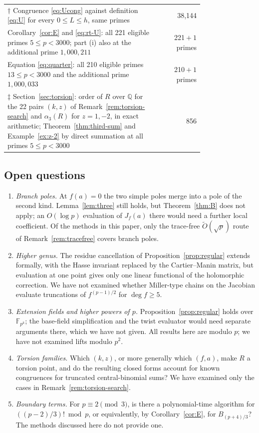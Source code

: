 \documentclass[11pt,a4paper]{article}
\numberwithin{equation}{section}
\theoremstyle{plain}
\theoremstyle{definition}
\newcommand{\F}{\mathbb{F}}
\begin{document}
\begin{table}[ht]
\begin{tabular}{@{}p{0.78\linewidth}r@{}}
$\dagger$ Congruence \eqref{eq:Ucong} against definition \eqref{eq:U} for every $0\le L\le h$, same primes & 38{,}144\\
Corollary~\ref{cor:E} and \eqref{eq:rt-U}: all 221 eligible primes $5\le p<3000$; part (i) also at the additional prime $1{,}000{,}211$ & 221${}+1$ primes\\
Equation \eqref{eq:quarter}: all 210 eligible primes $13\le p<3000$ and the additional prime $1{,}000{,}033$ & 210${}+1$ primes\\
$\ddagger$ Section~\ref{sec:torsion}: order of $R$ over $\mathbb Q$ for the 22 pairs $(k,z)$ of Remark~\ref{rem:torsion-search} and $\alpha_3(R)$ for $z=1,-2$, in exact arithmetic; Theorem~\ref{thm:third-sum} and Example~\ref{ex:z-2} by direct summation at all primes $5\le p<3000$ & 856\\
\bottomrule
\end{tabular}
\end{table}

\subsection*{Open questions}
\begin{enumerate}[nosep,leftmargin=*]
\item \emph{Branch poles.} At $f(a)=0$ the two simple poles merge into a pole of the second kind. Lemma~\ref{lem:three} still holds, but Theorem~\ref{thm:B} does not apply; an $O(\log p)$ evaluation of $J_f(a)$ there would need a further local coefficient. Of the methods in this paper, only the trace-free $\widetilde O(\sqrt p)$ route of Remark~\ref{rem:tracefree} covers branch poles.
\item \emph{Higher genus.} The residue cancellation of Proposition~\ref{prop:regular} extends formally, with the Hasse invariant replaced by the Cartier--Manin matrix, but evaluation at one point gives only one linear functional of the holomorphic correction. We have not examined whether Miller-type chains on the Jacobian evaluate truncations of $f^{(p-1)/2}$ for $\deg f\ge5$.
\item \emph{Extension fields and higher powers of $p$.} Proposition~\ref{prop:regular} holds over $\F_{p^k}$; the base-field simplification and the twist evaluator would need separate arguments there, which we have not given. All results here are modulo $p$; we have not examined lifts modulo $p^2$.
\item \emph{Torsion families.} Which $(k,z)$, or more generally which $(f,a)$, make $R$ a torsion point, and do the resulting closed forms account for known congruences for truncated central-binomial sums? We have examined only the cases in Remark~\ref{rem:torsion-search}.
\item \emph{Boundary terms.} For $p\equiv2\pmod 3$, is there a polynomial-time algorithm for $((p-2)/3)!\bmod p$, or equivalently, by Corollary~\ref{cor:E}, for $B_{(p+4)/3}$? The methods discussed here do not provide one.
\end{enumerate}
\end{document}
